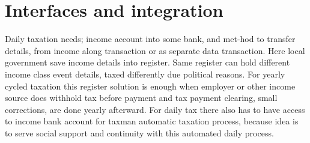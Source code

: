 \section{Interfaces and integration}
\label{interfaces_and_integration}
Daily taxation needs; income account into some bank, and met-hod to transfer details,
from income along transaction or as separate data transaction.
Here local government save income details into register.
Same register can hold different income class event details,
taxed differently due political reasons.
For yearly cycled taxation this register solution is enough
when employer or other income source does withhold tax before payment
and tax payment clearing, small corrections, are done yearly afterward.
For daily tax there also has to have access to income bank account
for taxman automatic taxation process,
because idea is to serve social support and continuity
with this automated daily process.

